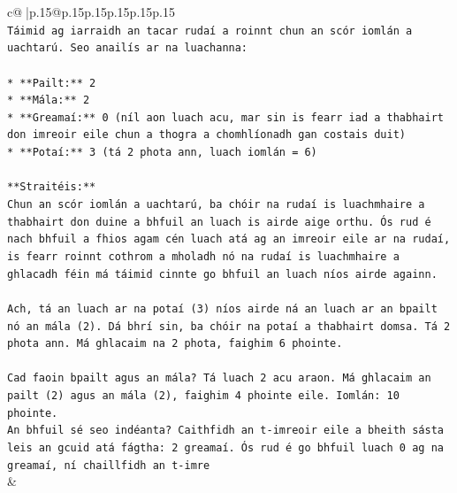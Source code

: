 \documentclass{article}
\begin{document}
{\begin{supertabular}{c@{$\;$}|p{.15\linewidth}@{}p{.15\linewidth}p{.15\linewidth}p{.15\linewidth}p{.15\linewidth}p{.15\linewidth}}
{{{\\ 
\texttt{Táimid ag iarraidh an tacar rudaí a roinnt chun an scór iomlán a uachtarú. Seo anailís ar na luachanna:} \\
\\ 
\texttt{*   **Pailt:** 2} \\
\texttt{*   **Mála:** 2} \\
\texttt{*   **Greamaí:** 0 (níl aon luach acu, mar sin is fearr iad a thabhairt don imreoir eile chun a thogra a chomhlíonadh gan costais duit)} \\
\texttt{*   **Potaí:** 3 (tá 2 phota ann, luach iomlán = 6)} \\
\\ 
\texttt{**Straitéis:**} \\
\texttt{Chun an scór iomlán a uachtarú, ba chóir na rudaí is luachmhaire a thabhairt don duine a bhfuil an luach is airde aige orthu. Ós rud é nach bhfuil a fhios agam cén luach atá ag an imreoir eile ar na rudaí, is fearr roinnt cothrom a mholadh nó na rudaí is luachmhaire a ghlacadh féin má táimid cinnte go bhfuil an luach níos airde againn.} \\
\\ 
\texttt{Ach, tá an luach ar na potaí (3) níos airde ná an luach ar an bpailt nó an mála (2). Dá bhrí sin, ba chóir na potaí a thabhairt domsa. Tá 2 phota ann. Má ghlacaim na 2 phota, faighim 6 phointe.} \\
\\ 
\texttt{Cad faoin bpailt agus an mála? Tá luach 2 acu araon. Má ghlacaim an pailt (2) agus an mála (2), faighim 4 phointe eile. Iomlán: 10 phointe.} \\
\texttt{An bhfuil sé seo indéanta? Caithfidh an t{-}imreoir eile a bheith sásta leis an gcuid atá fágtha: 2 greamaí. Ós rud é go bhfuil luach 0 ag na greamaí, ní chaillfidh an t{-}imre} \\
            }
        }
    }
    & \\ \\


\end{supertabular}}
\end{document}
